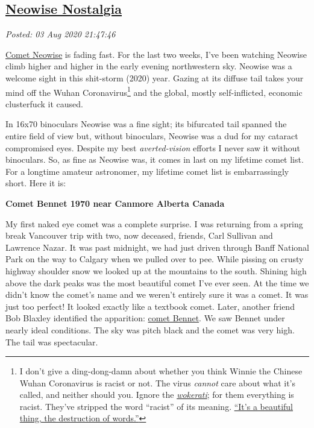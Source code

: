 %

\subsection*{\href{http://analyzethedatanotthedrivel.org/2020/08/03/neowise-nostalgia/}{Neowise Nostalgia}}


\noindent\emph{Posted: 03 Aug 2020 21:47:46}
\vspace{6pt}

\href{https://en.wikipedia.org/wiki/C/2020_F3_(NEOWISE)}{Comet Neowise}
is fading fast. For the last two weeks, I've been watching Neowise climb
higher and higher in the early evening northwestern sky. Neowise was a
welcome sight in this shit-storm (2020) year. Gazing at its diffuse tail
takes your mind off the Wuhan
Coronavirus\footnote{I don't give a ding-dong-damn about whether you think Winnie the
  Chinese Wuhan Coronavirus is racist or not. The virus \emph{cannot}
  care about what it's called, and neither should you. Ignore the
  \href{https://www.baltimoresun.com/opinion/op-ed/bs-ed-op-0630-wokerati-20190620-story.html}{\emph{wokerati}};
  for them everything is racist. They've stripped the word ``racist'' of
  its meaning.
  \href{https://www.goodreads.com/quotes/553001-it-s-a-beautiful-thing-the-destruction-of-words-of-course}{``It's a beautiful thing, the destruction of words.''}} and the global,
mostly self-inflicted, economic clusterfuck it caused.

In 16x70 binoculars Neowise was a fine sight; its bifurcated tail
spanned the entire field of view but, without binoculars, Neowise was a
dud for my cataract compromised eyes. Despite my best
\emph{averted-vision} efforts I never saw it without binoculars. So, as
fine as Neowise was, it comes in last on my lifetime comet list. For a
longtime amateur astronomer, my lifetime comet list is embarrassingly
short. Here it is:

\medskip

\noindent \textbf{Comet Bennet 1970 near Canmore Alberta Canada}

\medskip

My first naked eye comet was a complete surprise. I was returning from a
spring break Vancouver trip with two, now deceased, friends, Carl
Sullivan and Lawrence Nazar. It was past midnight, we had just driven
through Banff National Park on the way to Calgary when we pulled over to
pee. While pissing on crusty highway shoulder snow we looked up at the
mountains to the south. Shining high above the dark peaks was the most
beautiful comet I've ever seen. At the time we didn't know the comet's
name and we weren't entirely sure it was a comet. It was just too
perfect! It looked exactly like a textbook comet. Later, another friend
Bob Blaxley identified the apparition:
\href{https://en.wikipedia.org/wiki/Comet_Bennett}{comet Bennet}. We saw
Bennet under nearly ideal conditions. The sky was pitch black and the
comet was very high. The tail was spectacular.

